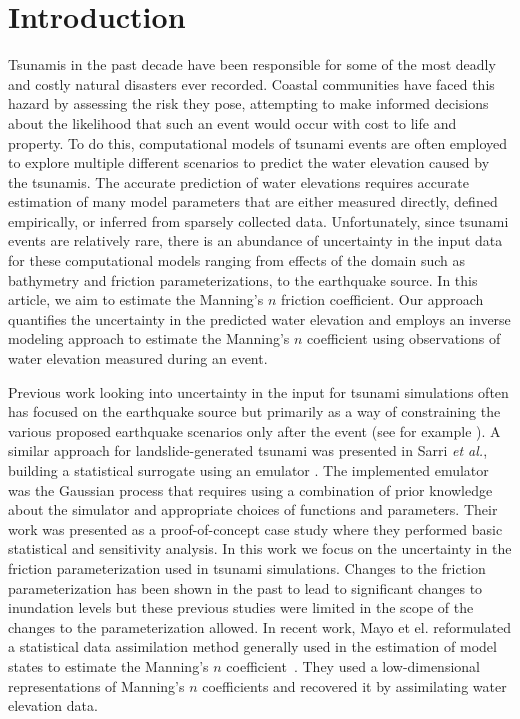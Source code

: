 
\section{Introduction}
\label{sec:intro}
Tsunamis in the past decade have been responsible for some of the most  deadly
and costly natural disasters ever recorded. Coastal communities  have faced this
hazard by assessing the risk they pose, attempting  to make informed decisions
about the likelihood that such an event would  occur with cost to life and
property.  To do this, computational models of  tsunami events are often
employed to explore multiple different scenarios to predict the water elevation
caused by the tsunamis. The accurate prediction  of water elevations requires
accurate estimation of many model parameters that  are either measured directly,
defined empirically, or inferred from sparsely collected data. Unfortunately,
since tsunami events are relatively rare,  there is an abundance of uncertainty
in the input data for these computational  models ranging from effects of the
domain such as bathymetry and friction parameterizations,  to the earthquake
source.  In this article, we aim to estimate the Manning's $n$ friction
coefficient. Our approach quantifies the uncertainty in the predicted water
elevation  and employs an inverse modeling approach to estimate the Manning's
$n$ coefficient using observations of water elevation measured during an event.

Previous work looking into uncertainty in the input for tsunami simulations
often has focused on the earthquake source but primarily as a way of
constraining the various proposed earthquake scenarios only after the event (see
for example \cite{MacInnes:2013cr}).  A similar approach for landslide-generated
tsunami was presented in Sarri \emph{et al.}, building a statistical surrogate
using an emulator \cite{Sarri2012}.  The implemented emulator was the Gaussian
process that requires using a combination of prior knowledge about the simulator
and appropriate choices of functions and parameters. Their work was presented as
a proof-of-concept case study where they performed basic statistical and
sensitivity analysis. In this work we focus on the uncertainty in the friction
parameterization used in tsunami simulations.  Changes to the friction
parameterization has been shown in the past to lead to significant changes to
inundation levels \cite{Myers:2001el,Jakeman:2010hk} but these previous studies
were limited in the scope of the changes to the parameterization allowed.  In
recent work, Mayo et el. reformulated a statistical data assimilation method
generally used in the estimation of model states to estimate the Manning's $n$
coefficient~\cite{Mayo2013}. They used a low-dimensional representations of
Manning's $n$ coefficients and recovered it by assimilating water elevation data.

